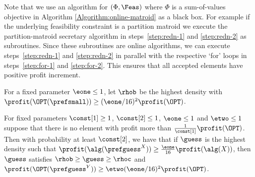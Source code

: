Note that we use an algorithm for
$(\Phi,\Feas)$ where $\Phi$ is a sum-of-values objective in Algorithm
\ref{Algorithm:online-matroid} as a black box. For example if the
underlying feasibility constraint is a partition matroid we execute
the partition-matroid secretary algorithm in steps~\ref{step:redn-1}
and \ref{step:redn-2} as subroutines. Since these subroutines are online algorithms, 
we can execute steps~\ref{step:redn-1} and
\ref{step:redn-2} in parallel with the respective `for' loops in
steps~\ref{step:for-1} and \ref{step:for-2}. This ensures that all
accepted elements have positive profit increment.

\begin{definition}
For a fixed parameter $\eone \leq 1 $, let $\rhob$ be the highest density with $\profit(\OPT(\prefsmall)) \geq (\eone/16)^2 \profit(\OPT)$.
\end{definition}

\begin{lemma}
  \label{lem:main} 
For fixed parameters $\const[1] \geq 1 $, $\const[2] \leq 1$,
$\eone \leq 1$ and $\etwo \leq 1$ suppose that there is no element
with profit more than $\frac{1}{\const[1]}\profit(\OPT)$. Then with
probability at least $\const[2]$, we have that if $\guess$ is the highest density  
such that $\profit(\alg(\prefguess^X)) \geq \frac{\eone}{16}\profit(\alg(X))$,
then $\guess$ satisfies
$\rhob\geq \guess \geq \rhoc$ and
$\profit(\OPT(\prefguess^Y)) \geq \etwo(\eone/16)^2 \profit(\OPT)$.
\end{lemma}

